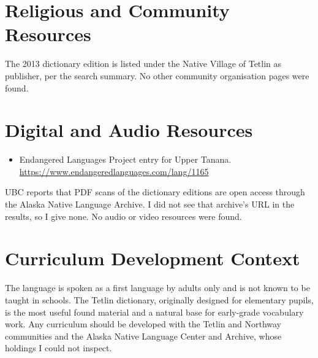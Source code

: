 \documentclass[12pt]{article}
\begin{document}
\section{Religious and Community Resources}
The 2013 dictionary edition is listed under the Native Village of Tetlin as publisher, per the search summary. No other community organisation pages were found.

\section{Digital and Audio Resources}
\begin{itemize}
\item Endangered Languages Project entry for Upper Tanana. \url{https://www.endangeredlanguages.com/lang/1165}
\end{itemize}
UBC reports that PDF scans of the dictionary editions are open access through the Alaska Native Language Archive. I did not see that archive's URL in the results, so I give none. No audio or video resources were found.

\section{Curriculum Development Context}
The language is spoken as a first language by adults only and is not known to be taught in schools. The Tetlin dictionary, originally designed for elementary pupils, is the most useful found material and a natural base for early-grade vocabulary work. Any curriculum should be developed with the Tetlin and Northway communities and the Alaska Native Language Center and Archive, whose holdings I could not inspect.
\end{document}
